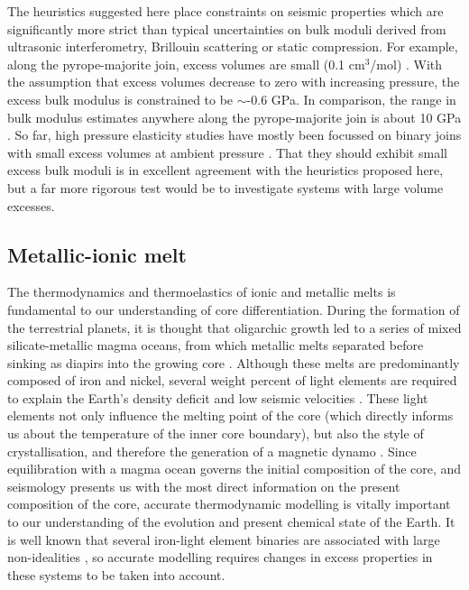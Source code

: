 \documentclass[review]{elsarticle}
\begin{document}
The heuristics suggested here place constraints on seismic properties which are significantly more strict than typical uncertainties on bulk moduli derived from ultrasonic interferometry, Brillouin scattering or static compression. For example, along the pyrope-majorite join, excess volumes are small (0.1 cm$^3$/mol) \citep{HSSR1997}. With the assumption that excess volumes decrease to zero with increasing pressure, the excess bulk modulus is constrained to be $\sim$-0.6 GPa. In comparison, the range in bulk modulus estimates anywhere along the pyrope-majorite join is about 10 GPa \citep[see, for example][]{HDLWB2010}. So far, high pressure elasticity studies have mostly been focussed on binary joins with small excess volumes at ambient pressure \citep{FXMLX2015, HC2014}. That they should exhibit small excess bulk moduli is in excellent agreement with the heuristics proposed here, but a far more rigorous test would be to investigate systems with large volume excesses.

\subsection{Metallic-ionic melt}
The thermodynamics and thermoelastics of ionic and metallic melts is fundamental to our understanding of core differentiation. During the formation of the terrestrial planets, it is thought that oligarchic growth led to a series of mixed silicate-metallic magma oceans, from which metallic melts separated before sinking as diapirs into the growing core \citep{Rubieetal2015}. Although these melts are predominantly composed of iron and nickel, several weight percent of light elements are required to explain the Earth's density deficit and low seismic velocities \citep{Poirier1994}. These light elements not only influence the melting point of the core (which directly informs us about the temperature of the inner core boundary), but also the style of crystallisation, and therefore the generation of a magnetic dynamo \citep{SSWL2007}. Since equilibration with a magma ocean governs the initial composition of the core, and seismology presents us with the most direct information on the present composition of the core, accurate thermodynamic modelling is vitally important to our understanding of the evolution and present chemical state of the Earth. It is well known that several iron-light element binaries are associated with large non-idealities \citep[e.g.][]{Frostetal2010}, so accurate modelling requires changes in excess properties in these systems to be taken into account.
\end{document}
